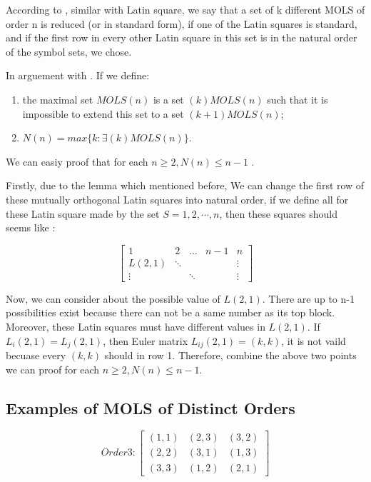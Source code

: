 \documentclass[12pt]{article}
\begin{document}
According to \cite{ref11}, similar with Latin square, we say that a set of k different MOLS of order n is reduced (or in standard form), if one of the Latin squares is standard, and if the first row in every other Latin square in this set is in the natural order of the symbol sets, we chose.

In arguement with \cite{ref12}. If we define:

\begin{enumerate}[1.]
\item the maximal set $MOLS(n)$ is a set $(k)MOLS(n)$ such that it is impossible to extend this set to a set $(k + 1)MOLS(n)$;
\item $N(n) = max\{k : \exists (k)MOLS(n)\}$.
\end{enumerate}
We can easiy proof that for each $n \ge 2, N(n) \le n - 1$ .

Firstly, due to the lemma which mentioned before, We can change the first row of these mutually orthogonal Latin squares into natural order, if we define all for these Latin square made by the set $S = {1, 2,\cdots,n}$, then these squares should seems like :

\[ \begin{bmatrix}
1 & 2 & \dots & n-1 & n \\
L(2,1) & \ddots &  &  & \vdots \\
\vdots &  & \ddots &  & \vdots \end{bmatrix} \]

Now, we can consider about the possible value of $L(2,1)$. There are up to n-1 possibilities exist because there can not be a same number as its top block. Moreover, these Latin squares must have different values in $L(2,1)$. If $L_i(2,1) = L_j(2,1)$, then Euler matrix $L_{ij}(2,1)=(k,k)$, it is not vaild becuase every $(k,k)$ should in row 1.
Therefore, combine the above two points we can proof for each $n \ge 2, N(n) \le n - 1$.

\subsection{Examples of MOLS of Distinct Orders}

\[Order 3:\begin{bmatrix}(1,1) & (2,3) & (3,2)\\
                         (2,2) & (3,1) & (1,3)\\
                         (3,3) & (1,2) & (2,1) \end{bmatrix} \]\\
\end{document}
